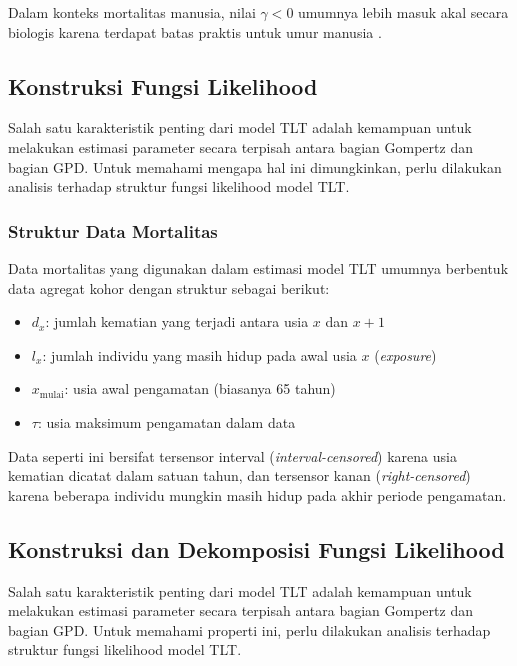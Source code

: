 Dalam konteks mortalitas manusia, nilai $\gamma < 0$ umumnya lebih masuk akal secara biologis karena terdapat batas praktis untuk umur manusia \citep{dong2016evidence}.

\subsection{Konstruksi Fungsi Likelihood}

Salah satu karakteristik penting dari model TLT adalah kemampuan untuk melakukan estimasi parameter secara terpisah antara bagian Gompertz dan bagian GPD. Untuk memahami mengapa hal ini dimungkinkan, perlu dilakukan analisis terhadap struktur fungsi likelihood model TLT.

\subsubsection{Struktur Data Mortalitas}

Data mortalitas yang digunakan dalam estimasi model TLT umumnya berbentuk data agregat kohor dengan struktur sebagai berikut:

\begin{itemize}
    \item $d_x$: jumlah kematian yang terjadi antara usia $x$ dan $x+1$
    \item $l_x$: jumlah individu yang masih hidup pada awal usia $x$ (\textit{exposure})
    \item $x_{\text{mulai}}$: usia awal pengamatan (biasanya 65 tahun)
    \item $\tau$: usia maksimum pengamatan dalam data
\end{itemize}

Data seperti ini bersifat tersensor interval (\textit{interval-censored}) karena usia kematian dicatat dalam satuan tahun, dan tersensor kanan (\textit{right-censored}) karena beberapa individu mungkin masih hidup pada akhir periode pengamatan.

\subsection{Konstruksi dan Dekomposisi Fungsi Likelihood}

Salah satu karakteristik penting dari model TLT adalah kemampuan untuk melakukan estimasi parameter secara terpisah antara bagian Gompertz dan bagian GPD. Untuk memahami properti ini, perlu dilakukan analisis terhadap struktur fungsi likelihood model TLT.

